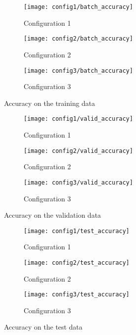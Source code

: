 \begin{figure}
\centering
\begin{subfigure}{\textwidth}
  \centering
  \texttt{[image: config1/batch\_accuracy]}
  \caption{Configuration 1}
\end{subfigure}
\begin{subfigure}{\textwidth}
  \centering
  \texttt{[image: config2/batch\_accuracy]}
  \caption{Configuration 2}
\end{subfigure}
\begin{subfigure}{\textwidth}
  \centering
  \texttt{[image: config3/batch\_accuracy]}
  \caption{Configuration 3}
\end{subfigure}
\caption{Accuracy on the training data}
\label{fig:batch_accuracy}
\end{figure}


\begin{figure}
\centering
\begin{subfigure}{\textwidth}
  \centering
  \texttt{[image: config1/valid\_accuracy]}
  \caption{Configuration 1}
  \label{fig:sub1}
\end{subfigure}
\begin{subfigure}{\textwidth}
  \centering
  \texttt{[image: config2/valid\_accuracy]}
  \caption{Configuration 2}
  \label{fig:sub2}
\end{subfigure}
\begin{subfigure}{\textwidth}
  \centering
  \texttt{[image: config3/valid\_accuracy]}
  \caption{Configuration 3}
  \label{fig:sub2}
\end{subfigure}
\caption{Accuracy on the validation data}
\label{fig:valid_accuracy}
\end{figure}


\begin{figure}
\centering
\begin{subfigure}{\textwidth}
  \centering
  \texttt{[image: config1/test\_accuracy]}
  \caption{Configuration 1}
  \label{fig:sub1}
\end{subfigure}
\begin{subfigure}{\textwidth}
  \centering
  \texttt{[image: config2/test\_accuracy]}
  \caption{Configuration 2}
  \label{fig:sub2}
\end{subfigure}
\begin{subfigure}{\textwidth}
  \centering
  \texttt{[image: config3/test\_accuracy]}
  \caption{Configuration 3}
  \label{fig:sub2}
\end{subfigure}
\caption{Accuracy on the test data}
\label{fig:test_accuracy}
\end{figure}

